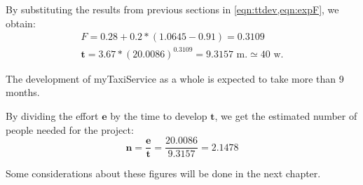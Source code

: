 By substituting the results from previous sections in \cref{eqn:ttdev,eqn:expF}, we obtain:\begin{gather}
%
	F = 0.28 + 0.2 * \left( 1.0645 - 0.91 \right) = 0.3109
	\\
	\mathbf{t} = 3.67 * {\left( 20.0086 \right)}^{0.3109} = 9.3157 \text{ m.} \simeq 40 \text{ w.} \label{eqn:timeVAL}
%
\end{gather}


The development of myTaxiService as a whole is expected to take more than 9 months.

By dividing the effort $ \mathbf{e} $ by the time to develop $ \mathbf{t} $, we get the estimated number of people needed for the project:\begin{equation}
%
	\mathbf{n} = \frac{\mathbf{e}}{\mathbf{t}} = \frac{20.0086}{9.3157} = 2.1478
%
\end{equation}

Some considerations about these figures will be done in the next chapter. 






